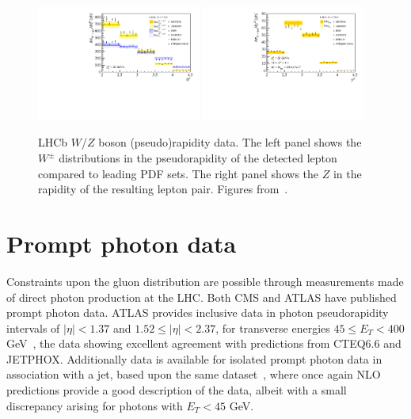 \begin{figure}[ht]
\centering
\includegraphics[width=0.48\textwidth]{5-LHCdata/figs/CSW20.pdf}
\includegraphics[width=0.48\textwidth]{5-LHCdata/figs/CSZ.pdf}
\caption[LHCb $W$/$Z$ boson (pseudo)rapidity data]{LHCb $W$/$Z$ boson (pseudo)rapidity data. The left panel shows the $W^{\pm}$ distributions in the pseudorapidity of the detected lepton compared to leading PDF sets. The right panel shows the $Z$ in the rapidity of the resulting lepton pair. Figures from~\cite{Aaij:2012vn}.}
\label{fig:LHCBWZ}
\end{figure}

%

\section{Prompt photon data}

Constraints upon the gluon distribution are possible through measurements made of direct photon production at the LHC. Both CMS and ATLAS have published prompt photon data. ATLAS provides inclusive data in photon pseudorapidity intervals of $|\eta| <1.37$ and $1.52 \le |\eta| < 2.37$, for transverse energies $45 \le E_T < 400$ GeV~\cite{Aad:2011tw}, the data showing excellent agreement with predictions from CTEQ6.6 and JETPHOX. Additionally data is available for isolated prompt photon data in association with a jet, based upon the same dataset~\cite{ATLAS:2012ar}, where once again NLO predictions provide a good description of the data, albeit with a small discrepancy arising for photons with $E_T < 45$ GeV.

